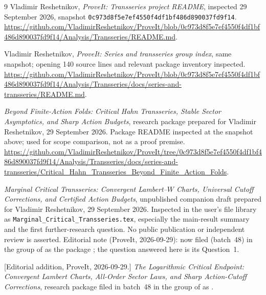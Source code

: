 \documentclass[11pt,a4paper]{article}
\numberwithin{equation}{section}
\theoremstyle{definition}
\theoremstyle{remark}
\begin{document}
{}
\begin{thebibliography}{9}
Vladimir Reshetnikov, \emph{ProveIt: Transseries project README}, inspected
29 September 2026, snapshot
\texttt{0c973d8f5e7ef4550f4df1bf486d890037fd9f14}.
\url{https://github.com/VladimirReshetnikov/ProveIt/blob/0c973d8f5e7ef4550f4df1bf486d890037fd9f14/Analysis/Transseries/README.md}.

Vladimir Reshetnikov, \emph{ProveIt: Series and transseries group index},
same snapshot; opening 140 source lines and relevant package inventory
inspected.
\url{https://github.com/VladimirReshetnikov/ProveIt/blob/0c973d8f5e7ef4550f4df1bf486d890037fd9f14/Analysis/Transseries/docs/series-and-transseries/README.md}.

\emph{Beyond Finite-Action Folds: Critical Hahn Transseries, Stable Sector
Asymptotics, and Sharp Action Budgets}, research package prepared for Vladimir
Reshetnikov, 29 September 2026. Package README inspected at the snapshot above;
used for scope comparison, not as a proof premise.
\url{https://github.com/VladimirReshetnikov/ProveIt/tree/0c973d8f5e7ef4550f4df1bf486d890037fd9f14/Analysis/Transseries/docs/series-and-transseries/Critical_Hahn_Transseries_Beyond_Finite_Action_Folds}.

\emph{Marginal Critical Transseries: Convergent Lambert--$W$ Charts, Universal
Cutoff Corrections, and Certified Action Budgets}, unpublished companion draft
prepared for Vladimir Reshetnikov, 29 September 2026. Inspected in the user's
file library as \texttt{Marginal\_Critical\_Transseries.tex}, especially the
main-result summary and the first further-research question. No public
publication or independent review is asserted.
Editorial note (ProveIt, 2026-09-29): now filed (batch~48) in the group of
\cite{repo-index} as the package
; the question answered
here is its Question~1.

[Editorial addition, ProveIt, 2026-09-29.]
\emph{The Logarithmic Critical Endpoint: Convergent Lambert Charts,
All-Order Sector Laws, and Sharp Action-Cutoff Corrections}, research
package filed in batch~48 in the group of \cite{repo-index} as
.


\end{thebibliography}
\end{document}
